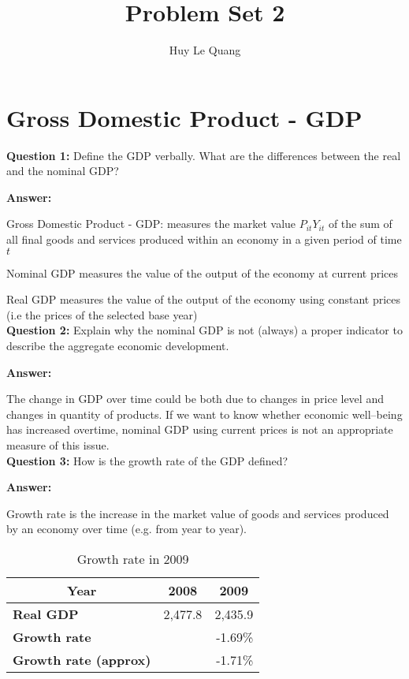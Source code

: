 \documentclass[a4paper, 11pt]{article}
\title{Problem Set 2}
\author{Huy Le Quang}
\begin{document}
\maketitle

\section {Gross Domestic Product - GDP}

\textbf{Question 1:} Define the GDP verbally. What are the differences between the real and the nominal GDP?

\textbf{Answer:} 

Gross Domestic Product - GDP: measures the market value $P_{it}Y_{it}$ of the sum of all final goods and services produced within an economy in a given period of time $t$

Nominal GDP measures the value of the output of the economy at current prices

Real GDP measures the value of the output of the economy using constant prices (i.e the prices of the selected base year) \\

\textbf{Question 2:} Explain why the nominal GDP is not (always) a proper indicator to describe the aggregate economic development. 

\textbf{Answer:} 

The change in GDP over time could be both due to changes in price level and changes in quantity of products. If we want to know whether economic well--being has increased overtime, nominal GDP using current prices is not an appropriate measure of this issue. \\

\textbf{Question 3:} How is the growth rate of the GDP defined?

\textbf{Answer:}

Growth rate is the increase in the market value of goods and services produced by an economy over time (e.g. from year to year).

\begin{table}[htbp]
  \centering
  \caption{Growth rate in 2009}
    \begin{tabular}{lrr}
    \toprule
    \toprule
    \multicolumn{1}{c}{\textbf{Year}} & \multicolumn{1}{c}{\textbf{2008}} & \multicolumn{1}{c}{\textbf{2009}} \\
    \midrule
    \textbf{Real GDP} &                         2,477.8    &        2,435.9    \\
    \textbf{Growth rate} &       & -1.69\% \\
    \textbf{Growth rate (approx)} &       & -1.71\% \\
    \bottomrule
    \end{tabular}%

\end{table}%
\end{document}
